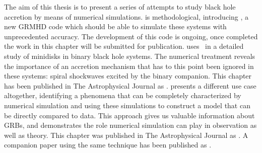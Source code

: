 The aim of this thesis is to present a series of attempts to study black hole accretion by means of numerical simulations.   is methodological, introducing \grdisco, a new GRMHD code which should be able to simulate these systems with unprecedented accuracy.  The development of this code is ongoing, once completed the work in this chapter will be submitted for publication.   uses \grdisco\ in a detailed study of minidisks in binary black hole systems.  The numerical treatment reveals the importance of an accretion mechanism that has to this point been ignored in these systems: spiral shockwaves excited by the binary companion.  This chapter has been published in The Astrophysical Journal as \cite{Ryan17}.   presents a different use case altogether, identifying a phenomena that can be completely characterized by numerical simulation and using these simulations to construct a model that can be directly compared to data.  This approach gives us valuable information about GRBs, and demonstrates the role numerical simulation can play in observation as well as theory.  This chapter was published in The Astrophysical Journal as \cite{Ryan15}.  A companion paper using the same technique has been published as \cite*{Zhang15}.

